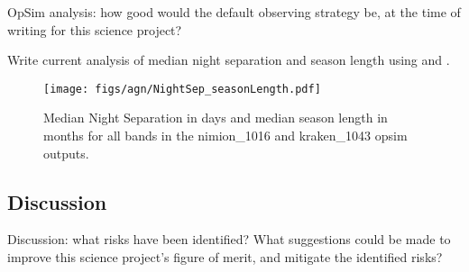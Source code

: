 OpSim analysis: how good would the default observing strategy be, at
the time of writing for this science project?

 Write current analysis of median night separation and season length using  and . 

\begin{center}
\begin{figure}
\texttt{[image: figs/agn/NightSep\_seasonLength.pdf]}
\caption{Median Night Separation in days and median season length in months for all bands in the nimion\_1016 and kraken\_1043 opsim outputs.}
\label{microfig}
\end{figure}
\end{center}


\subsection{Discussion}
\label{sec:\secname:discussion}

Discussion: what risks have been identified? What suggestions could be
made to improve this science project's figure of merit, and mitigate
the identified risks?



\navigationbar

